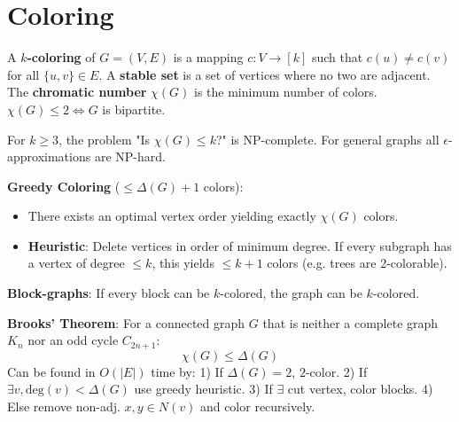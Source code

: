 \section{Coloring}

\begin{definition}
	A \textbf{$k$-coloring} of $G = (V, E)$ is a mapping $c: V \to [k]$ such that $c(u) \neq c(v)$ for all $\{u,v\} \in E$.
	A \textbf{stable set} is a set of vertices where no two are adjacent.
	The \textbf{chromatic number} $\chi(G)$ is the minimum number of colors.
	$\chi(G) \le 2 \iff G$ is bipartite.
\end{definition}

\begin{theorem}
	For $k \ge 3$, the problem "Is $\chi(G) \le k$?" is NP-complete. For general graphs all $\epsilon$-approximations are NP-hard.
\end{theorem}

\begin{algorithm}
	\textbf{Greedy Coloring} ($\le \Delta(G) + 1$ colors):
	\begin{itemize}
		\item There exists an optimal vertex order yielding exactly $\chi(G)$ colors.
		\item \textbf{Heuristic}: Delete vertices in order of minimum degree. If every subgraph has a vertex of degree $\le k$, this yields $\le k+1$ colors (e.g. trees are $2$-colorable).
	\end{itemize}
	\textbf{Block-graphs}: If every block can be $k$-colored, the graph can be $k$-colored.
\end{algorithm}

\begin{theorem}
	\textbf{Brooks' Theorem}: For a connected graph $G$ that is neither a complete graph $K_n$ nor an odd cycle $C_{2n+1}$:
	$$\chi(G) \le \Delta(G)$$
	Can be found in $O(|E|)$ time by: 1) If $\Delta(G)=2$, $2$-color. 2) If $\exists v, \text{deg}(v) < \Delta(G)$ use greedy heuristic. 3) If $\exists$ cut vertex, color blocks. 4) Else remove non-adj. $x,y \in N(v)$ and color recursively.
\end{theorem}
